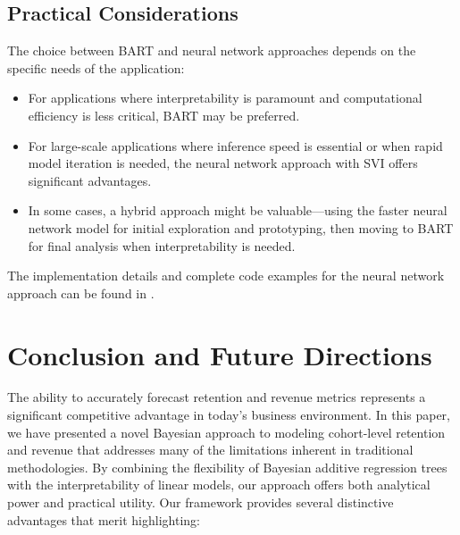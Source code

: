 \documentclass[11pt]{amsart}
\theoremstyle{definition}
\begin{document}
\subsection{Practical Considerations}

The choice between BART and neural network approaches depends on the specific needs of the application:

\begin{itemize}
    \item For applications where interpretability is paramount and computational efficiency is less critical, BART may be
          preferred.

    \item For large-scale applications where inference speed is essential or when rapid model iteration is needed, the neural
          network approach with SVI offers significant advantages.

    \item In some cases, a hybrid approach might be valuable—using the faster neural network model for initial exploration
          and prototyping, then moving to BART for final analysis when interpretability is needed.
\end{itemize}

The implementation details and complete code examples for the neural network approach can be found in
\cite{orduz_revenue_retention_numpyro}.

\section{Conclusion and Future Directions}

The ability to accurately forecast retention and revenue metrics represents a significant competitive advantage in today's
business environment. In this paper, we have presented a novel Bayesian approach to modeling cohort-level retention and
revenue that addresses many of the limitations inherent in traditional methodologies. By combining the flexibility of
Bayesian additive regression trees with the interpretability of linear models, our approach offers both analytical power and
practical utility. Our framework provides several distinctive advantages that merit highlighting:
\end{document}
